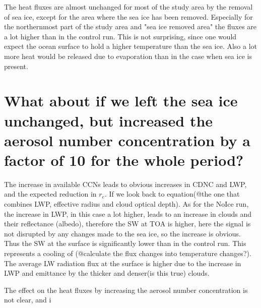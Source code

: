 The heat fluxes are almost unchanged for most of the study area by the removal of sea ice, except for the area where the sea ice has been removed. Especially for the northernmost part of the study area and "sea ice removed area" the fluxes are a lot higher than in the control run. This is not surprising, since one would expect the ocean surface to hold a higher temperature than the sea ice. Also a lot more heat would be released due to evaporation than in the case when sea ice is present.

\section{What about if we left the sea ice unchanged, but increased the aerosol number concentration by a factor of 10 for the whole period?}
The increase in available CCNs leads to obvious increases in CDNC and LWP, and the expected reduction in $r_e$. If we look back to equation(@the one that combines LWP, effective radius and cloud optical depth). As for the NoIce run, the increase in LWP, in this case a lot higher, leads to an increase in clouds and their reflectance (albedo), therefore the SW at TOA is higher, here the signal is not disrupted by any changes made to the sea ice, so the increase is obvious. Thus the SW at the surface is significantly lower than in the control run. This represents a cooling of (@calculate the flux changes into temperature changes?). The average LW radiation flux at the surface is higher due to the increase in LWP and emittance by the thicker and denser(is this true) clouds.

The effect on the heat fluxes by increasing the aerosol number concentration is not clear, and i 






